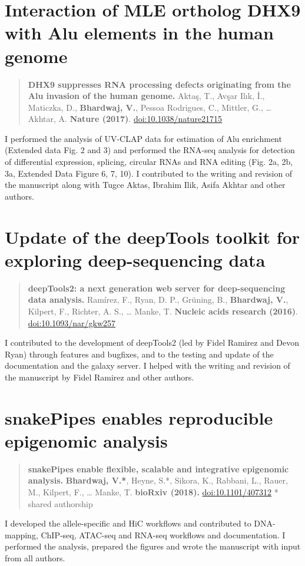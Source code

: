 \documentclass[11pt,twoside]{MPIthesis}
\theoremstyle{definition}
\theoremstyle{definition}
\theoremstyle{definition}
\theoremstyle{remark}
\begin{document}
\section{Interaction of MLE ortholog DHX9 with Alu elements in the human
genome}\label{interaction-of-mle-ortholog-dhx9-with-alu-elements-in-the-human-genome}
\begin{quote}
\textbf{DHX9 suppresses RNA processing defects originating from the Alu
invasion of the human genome.} Aktaş, T., Avşar Ilık, İ., Maticzka, D.,
\textbf{Bhardwaj, V.}, Pessoa Rodrigues, C., Mittler, G., \ldots{}
Akhtar, A. \textbf{Nature (2017)}. \url{doi:10.1038/nature21715}
\end{quote}
I performed the analysis of UV-CLAP data for estimation of Alu
enrichment (Extended data Fig. 2 and 3) and performed the RNA-seq
analysis for detection of differential expression, splicing, circular
RNAs and RNA editing (Fig. 2a, 2b, 3a, Extended Data Figure 6, 7, 10). I
contributed to the writing and revision of the manuscript along with
Tugce Aktas, Ibrahim Ilik, Asifa Akhtar and other authors.



\section{Update of the deepTools toolkit for exploring deep-sequencing
data}\label{update-of-the-deeptools-toolkit-for-exploring-deep-sequencing-data}
\begin{quote}
\textbf{deepTools2: a next generation web server for deep-sequencing
data analysis.} Ramírez, F., Ryan, D. P., Grüning, B., \textbf{Bhardwaj,
V.}, Kilpert, F., Richter, A. S., \ldots{} Manke, T. \textbf{Nucleic
acids research (2016)}. \url{doi:10.1093/nar/gkw257}
\end{quote}
I contributed to the development of deepTools2 (led by Fidel Ramirez and
Devon Ryan) through features and bugfixes, and to the testing and update
of the documentation and the galaxy server. I helped with the writing
and revision of the manuscript by Fidel Ramirez and other authors.



\section{snakePipes enables reproducible epigenomic
analysis}\label{snakepipes-enables-reproducible-epigenomic-analysis}
\begin{quote}
\textbf{snakePipes enable flexible, scalable and integrative epigenomic
analysis.} \textbf{Bhardwaj, V.*}, Heyne, S.*, Sikora, K., Rabbani, L.,
Rauer, M., Kilpert, F., \ldots{} Manke, T. \textbf{bioRxiv (2018).}
\url{doi:10.1101/407312} * shared authorship
\end{quote}
I developed the allele-specific and HiC workflows and contributed to
DNA-mapping, ChIP-seq, ATAC-seq and RNA-seq workflows and documentation.
I performed the analysis, prepared the figures and wrote the manuscript
with input from all authors.
\end{document}
